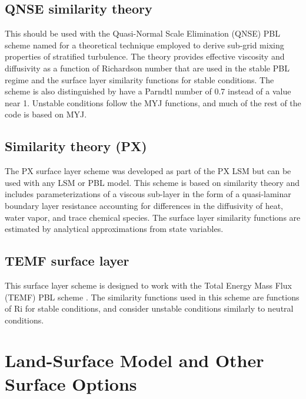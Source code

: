 \subsection{QNSE similarity theory}

This should be used with the Quasi-Normal Scale Elimination (QNSE) PBL scheme
\citep{sukoriansky05} named for a theoretical technique employed to derive sub-grid
mixing properties of stratified turbulence. The theory provides effective viscosity and
diffusivity as a function of Richardson number that are used in the stable PBL regime
and the surface layer similarity functions for stable conditions. The scheme is also
distinguished by have a Parndtl number of 0.7 instead of a value near 1. Unstable conditions 
follow the MYJ functions, and much of the rest of the code is based on MYJ.

\subsection{Similarity theory (PX)}

The PX surface layer scheme \citep{pleim06} was developed as part of the PX LSM but can be used with any LSM or PBL model.  This scheme is based on similarity theory and includes parameterizations of a viscous sub-layer in the form of a quasi-laminar boundary layer resistance accounting for differences in the diffusivity of heat, water vapor, and trace chemical species.   The surface layer similarity functions are estimated by analytical approximations from state variables.  

\subsection{TEMF surface layer}

This surface layer scheme is designed to work with the Total Energy Mass Flux (TEMF) PBL scheme
\citep{angevine10}. The similarity functions used in this scheme are functions of Ri for stable conditions,
and consider unstable conditions similarly to neutral conditions.


\section{Land-Surface Model and Other Surface Options}

